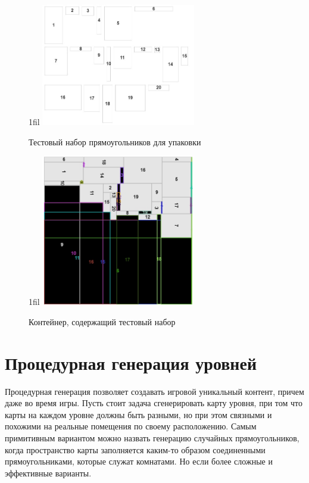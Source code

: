 \documentclass[a4paper,12pt]{report}
\makeatletter
\newcommand*{\centerfloat}{%
  \parindent \z@
  \leftskip \z@ \@plus 1fil \@minus \textwidth
  \rightskip\leftskip
  \parfillskip \z@skip}
\makeatother
\begin{document}
\begin{figure}
    \centerfloat
    \includegraphics[width=0.6\textwidth]{packing/5.jpg}
    \caption{Тестовый набор прямоугольников для упаковки}
    \label{fig:maxrects-impl}
\end{figure}

\begin{figure}
    \centerfloat
    \includegraphics[width=0.6\textwidth]{packing/6.jpg}
    \caption{Контейнер, содержащий тестовый набор}
    \label{fig:maxrects-impl2}
\end{figure}

\chapter{Процедурная генерация уровней}

\parindent=1cm
Процедурная генерация позволяет создавать игровой уникальный контент, причем даже во время игры. Пусть стоит задача сгенерировать карту уровня, при том что карты на каждом уровне должны быть разными, но при этом связными и похожими на реальные помещения по своему расположению. Самым примитивным вариантом можно назвать генерацию случайных прямоугольников, когда пространство карты заполняется каким-то образом соединенными прямоугольниками, которые служат комнатами. Но если более сложные и эффективные варианты.
\end{document}
